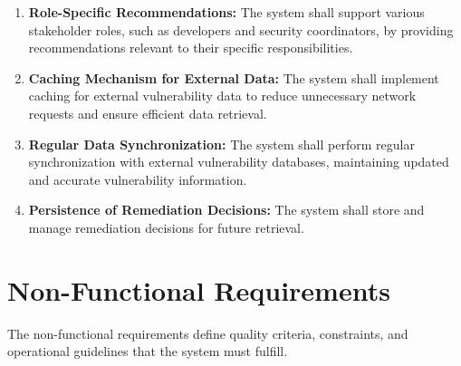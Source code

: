 \begin{enumerate}
	\item \label{req:role_specific_recommendations}
	      \textbf{Role-Specific Recommendations:} The system shall support various stakeholder roles, such as developers and security coordinators, by providing recommendations relevant to their specific responsibilities.
	      
	\item \label{req:data_caching_mechanism}
	      \textbf{Caching Mechanism for External Data:} The system shall implement caching for external vulnerability data to reduce unnecessary network requests and ensure efficient data retrieval.
	      
	\item \label{req:data_synchronization}
	      \textbf{Regular Data Synchronization:} The system shall perform regular synchronization with external vulnerability databases, maintaining updated and accurate vulnerability information.
	      
	\item \label{req:ssvc_recommendation_persistence}
	      \textbf{Persistence of Remediation Decisions:} The system shall store and manage remediation decisions for future retrieval.
	      
\end{enumerate}

\section{Non-Functional Requirements}
The non-functional requirements define quality criteria, constraints, and operational guidelines that the system must fulfill.

